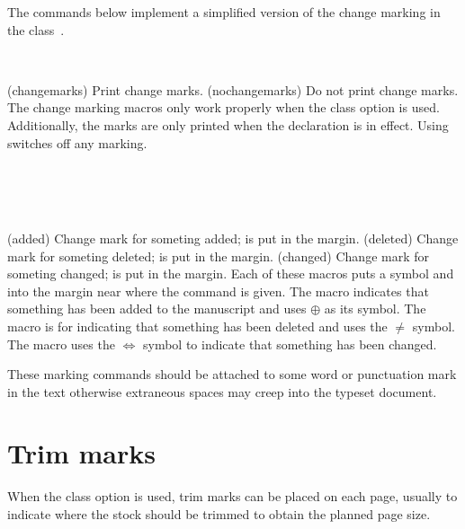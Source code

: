    The commands below implement a simplified version of the change
marking in the  class~\cite{ISOCLASS}.

\begin{syntax}
\cmd{\changemarks} \cmd{\nochangemarks} \\
\end{syntax}
\glossary(changemarks)%
  {}%
  {Print change marks.}
\glossary(nochangemarks)%
  {}%
  {Do not print change marks.}
The change marking macros only work properly when the  class
option is used. Additionally, the marks are only printed when the 
\cmd{\changemarks} declaration is in effect. Using \cmd{\nochangemarks}
switches off any marking.

\begin{syntax}
\cmd{\added} \\
\cmd{\deleted} \\
\cmd{\changed} \\
\end{syntax}
\glossary(added)%
  {}%
  {Change mark for someting added;  is put in the margin.}
\glossary(deleted)%
  {}%
  {Change mark for someting deleted;  is put in the margin.}
\glossary(changed)%
  {}%
  {Change mark for someting changed;  is put in the margin.}
Each of these macros puts a symbol and  into the 
margin near
where the command is given. The \cmd{\added} macro indicates that something
has been added to the manuscript and uses $\oplus$ as its symbol. The
\cmd{\deleted} macro is for indicating that something has been deleted and uses
the $\neq$ symbol. The macro \cmd{\changed} uses the $\Leftrightarrow$ symbol
to indicate that something has been changed.

    These marking commands should be attached to some word or punctuation
mark in the text otherwise extraneous spaces may creep into the typeset
document.

\section{Trim marks}

    When the class  option is used, trim
marks can be placed on each page, usually to indicate where the stock should
be trimmed to obtain the planned page size. 

